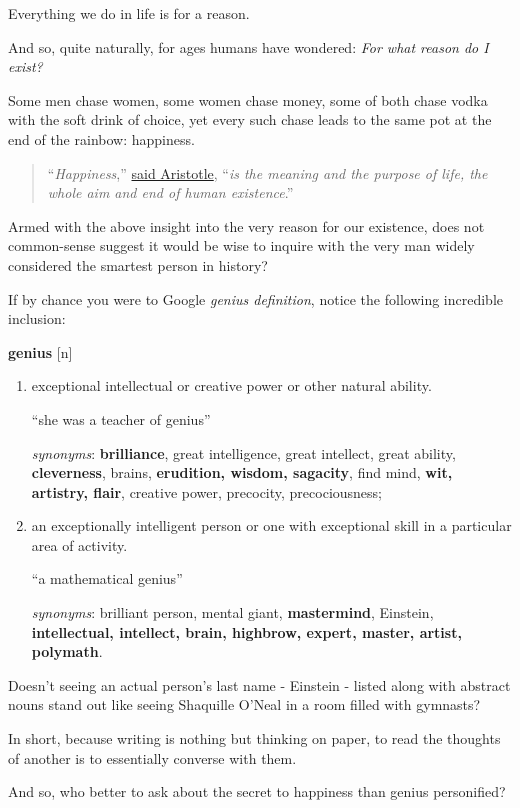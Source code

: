 \documentclass{article}
\begin{document}
Everything we do in life is for a reason.

And so, quite naturally, for ages humans have wondered: \textit{For what reason do I exist?}

%
Some men chase women, some women chase money, some of both chase vodka with the soft drink of choice, yet every such chase leads to the same pot at the end of the rainbow: happiness.

\begin{quotation}
	``\textit{Happiness},'' \href{https://historyofeconomicthought.mcmaster.ca/aristotle/Ethics.pdf}{said Aristotle}, ``\textit{is the meaning and the purpose of life, the whole aim and end of human existence}.''
\end{quotation}
Armed with the above insight into the very reason for our existence, does not common-sense suggest it would be wise to inquire with the very man widely considered the smartest person in history?

%
If by chance you were to Google \textit{genius definition}, notice the following incredible inclusion:

\textbf{genius} [n]
\begin{enumerate}
	\item exceptional intellectual or creative power or other natural ability.
	
	``she was a teacher of genius''
	
	\textit{synonyms}: \textbf{brilliance}, great intelligence, great intellect, great ability, \textbf{cleverness}, brains, \textbf{erudition, wisdom, sagacity}, find mind, \textbf{wit, artistry, flair}, creative power, precocity, precociousness;
	\item an exceptionally intelligent person or one with exceptional skill in a particular area of activity.
	
	``a mathematical genius''
	
	\textit{synonyms}: brilliant person, mental giant, \textbf{mastermind}, Einstein, \textbf{intellectual, intellect, brain, highbrow, expert, master, artist, polymath}. 
\end{enumerate}
Doesn't seeing an actual person's last name - Einstein - listed along with abstract nouns stand out like seeing Shaquille O'Neal in a room filled with gymnasts?

%
In short, because writing is nothing but thinking on paper, to read the thoughts of another is to essentially converse with them.

And so, who better to ask about the secret to happiness than genius personified?
\end{document}
